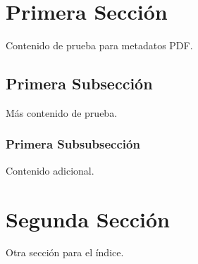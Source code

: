 \documentclass{ui1activity}
\begin{document}
\makecustomcover

\section{Primera Sección}
Contenido de prueba para metadatos PDF.

\subsection{Primera Subsección}
Más contenido de prueba.

\subsubsection{Primera Subsubsección}
Contenido adicional.

\section{Segunda Sección}
Otra sección para el índice.
\end{document}
